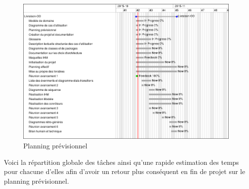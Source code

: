 \documentclass[paper=a4, fontsize=11pt]{report}
\numberwithin{equation}{section}		%
\numberwithin{figure}{section}		%
\numberwithin{table}{section}		%
\begin{document}
\begin{figure}[H]
\centering
\includegraphics[scale=0.5,angle=0]{figures/gantt-prev.png}
\caption{Planning prévisionnel}
\end{figure}

Voici la répartition globale des tâches ainsi qu'une rapide estimation des temps pour chacune d'elles afin d'avoir un retour plus conséquent en fin de projet sur le planning prévisionnel.
\end{document}
